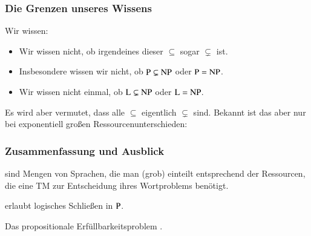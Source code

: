 \documentclass[onlymath]{beamer}
\begin{document}
\begin{frame}\frametitle{Die Grenzen unseres Wissens}

Wir wissen:

\theobox{
\[\Scomplclass{L}\subseteq\Scomplclass{NL}\subseteq \Scomplclass{P}\subseteq\Scomplclass{NP}\subseteq\Scomplclass{PSpace}= \Scomplclass{NPSpace}\subseteq \Scomplclass{Exp}\subseteq \Scomplclass{NExp}\]
\vspace{-2.5ex}
}

\begin{itemize}
\item Wir wissen nicht, ob irgendeines dieser $\subseteq$ sogar $\subsetneq$ ist.
\item Insbesondere wissen wir nicht, ob ${\textsc{P}}\subsetneq{\textsc{NP}}$ oder ${\textsc{P}}={\textsc{NP}}$.
\item Wir wissen nicht einmal, ob ${\textsc{L}}\subsetneq{\textsc{NP}}$ oder ${\textsc{L}}={\textsc{NP}}$.
\end{itemize}\pause
Es wird aber vermutet, dass alle  $\subseteq$ eigentlich $\subsetneq$ sind.
% 
Bekannt ist das aber nur bei exponentiell großen Ressourcenunterschieden:


\end{frame}


\begin{frame}\frametitle{Zusammenfassung und Ausblick}

 sind Mengen von Sprachen, die man (grob) einteilt entsprechend der Ressourcen,
die eine TM zur Entscheidung ihres Wortproblems benötigt.
\bigskip


 erlaubt logisches Schließen in ${\textsc{P}}$.
\bigskip

Das propositionale Erfüllbarkeitsproblem .
\bigskip


\end{frame}
\end{document}
